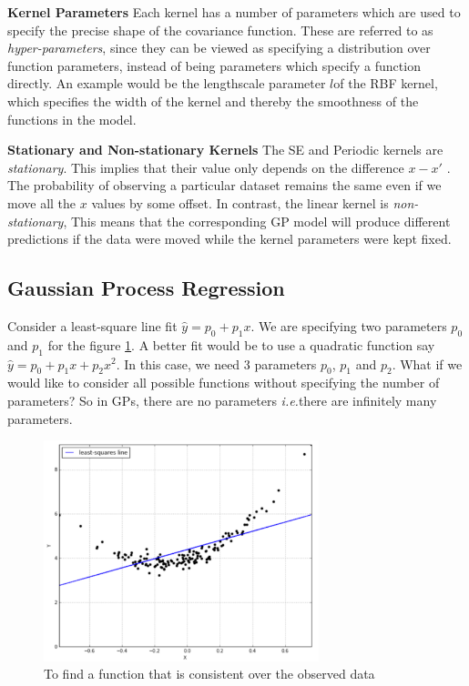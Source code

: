 \documentclass[12pt]{report}
\newcommand{\ie}{\textit{i.e.}}
\begin{document}
\cite{rasmussen2003gaussian}

\textbf{Kernel Parameters} Each kernel has a number of parameters which are used to specify the precise shape of the covariance function. These are referred to as \textit{hyper-parameters}, since they can be viewed as specifying a distribution over function parameters, instead of being parameters which specify a function directly. 
An example would be the lengthscale parameter $l$of the RBF kernel, which specifies the width of the kernel and thereby the smoothness of the functions in the model.

\textbf{Stationary and Non-stationary Kernels} The SE and Periodic kernels are \textit{stationary}. This implies that their value only depends on the difference $x − x'$ . The probability of observing a particular dataset remains the same even if we move all the $x$ values by some offset. In contrast, the linear kernel is \textit{non-stationary}, This means that the corresponding GP model will produce different predictions if the data were moved while the kernel parameters were kept fixed.

\subsection{Gaussian Process Regression}
\label{GPR}
Consider a least-square line fit  $\hat{y} = p_0 + p_1x$. We are specifying two parameters $p_0$ and $p_1$ for the figure \ref{fig:lease_square}. A better fit would be to use a quadratic function say $\hat{y} = p_0 + p_1x + p_2x^2$. In this case, we need $3$ parameters $p_0$, $p_1$ and $p_2$. What if we would like to consider all possible functions without specifying the number of parameters? So in GPs, there are no parameters \ie there are infinitely many parameters. \par
\begin{figure}[htp]
	\centering 
	\includegraphics[width=8cm]{ls_fit.pdf}
	\caption{To find a function that is consistent over the observed data}
   \label{fig:lease_square}
\end{figure}
\end{document}
